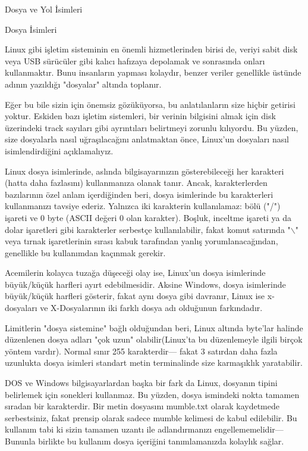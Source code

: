 \begin{section}{Dosya ve Yol İsimleri}
\begin{subsection}{Dosya İsimleri}

Linux gibi işletim sisteminin en önemli hizmetlerinden birisi de, veriyi sabit disk veya USB sürücüler gibi kalıcı hafızaya depolamak ve sonrasında onları kullanmaktır. Bunu insanların yapması kolaydır, benzer veriler genellikle üstünde adının yazıldığı "dosyalar" altında toplanır.

Eğer bu bile sizin için önemsiz gözüküyorsa, bu anlatılanların size hiçbir getirisi yoktur. Eskiden bazı işletim sistemleri, bir verinin bilgisini almak için disk üzerindeki track sayıları gibi ayrıntıları belirtmeyi zorunlu kılıyordu. Bu yüzden, size dosyalarla nasıl uğraşılacağını anlatmaktan önce, Linux'un dosyaları nasıl isimlendirdiğini açıklamalıyız.

Linux dosya isimlerinde, aslında bilgisayarınızın gösterebileceği her karakteri (hatta daha fazlasını) kullanmanıza olanak tanır. Ancak, karakterlerden bazılarının özel anlam içerdiğinden beri, dosya isimlerinde bu karakterleri kullanmanızı tavsiye ederiz. Yalnızca iki karakterin kullanılamaz: bölü ("/") işareti ve 0 byte (ASCII değeri 0 olan karakter). Boşluk, inceltme işareti ya da dolar işaretleri gibi karakterler serbestçe kullanılabilir, fakat komut satırında "$\backslash$" veya tırnak işaretlerinin sırası kabuk tarafından yanlış yorumlanacağından, genellikle bu kullanımdan kaçınmak gerekir.

Acemilerin kolayca tuzağa düşeceği olay ise, Linux'un dosya isimlerinde büyük/küçük harfleri ayırt edebilmesidir. Aksine Windows, dosya isimlerinde büyük/küçük harfleri gösterir, fakat aynı dosya gibi davranır, Linux ise x-dosyaları ve X-Dosyalarının iki farklı dosya adı olduğunun farkındadır.

	Limitlerin "dosya sistemine" bağlı olduğundan beri, Linux altında byte'lar halinde düzenlenen dosya adları "çok uzun" olabilir(Linux'ta  bu düzenlemeyle ilgili birçok yöntem vardır). Normal sınır 255 karakterdir— fakat 3 satırdan daha fazla uzunlukta dosya isimleri standart metin terminalinde size karmaşıklık yaratabilir.
	
	DOS ve Windows bilgisayarlardan başka bir fark da Linux, dosyanın tipini belirlemek için sonekleri kullanmaz. Bu yüzden, dosya ismindeki nokta tamamen sıradan bir karakterdir. Bir metin dosyasını mumble.txt olarak kaydetmede serbestsiniz, fakat prensip olarak sadece mumble kelimesi de  kabul edilebilir. Bu kullanım tabi ki sizin tamamen uzantı ile adlandırmanızı engellememelidir—Bununla birlikte bu kullanım dosya içeriğini tanımlamanızda kolaylık sağlar.
	

\end{subsection}
\end{section}

